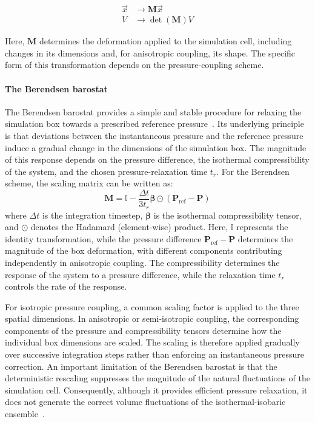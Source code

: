 \begin{subequations}\label{eq:scaling_general}
    \begin{align}
        \vec{x} &\rightarrow \mathbf{M}\vec{x} \\
        V &\rightarrow \det(\mathbf{M})V
    \end{align}
\end{subequations}

Here, $\mathbf{M}$ determines the deformation applied to the simulation cell, including changes in its dimensions and, for anisotropic coupling, its shape. The specific form of this transformation depends on the pressure-coupling scheme.


\paragraph{The Berendsen barostat}
The Berendsen barostat provides a simple and stable procedure for relaxing the simulation box towards a prescribed reference pressure~\cite{BerendsenB}. Its underlying principle is that deviations between the instantaneous pressure and the reference pressure induce a gradual change in the dimensions of the simulation box. The magnitude of this response depends on the pressure difference, the isothermal compressibility of the system, and the chosen pressure-relaxation time $t_r$.
For the Berendsen scheme, the scaling matrix can be written as:
\begin{equation}\label{eq:berendsen}
\mathbf{M}
=
\mathbb{I}
-
\frac{\Delta t}{3t_r}
\boldsymbol{\beta}
\odot
\left(
\mathbf{P}_{\mathrm{ref}}-\mathbf{P}
\right)
\end{equation}
where $\Delta t$ is the integration timestep, $\boldsymbol{\beta}$ is the isothermal compressibility tensor, and $\odot$ denotes the Hadamard
(element-wise) product. Here, $\mathbb{I}$ represents the identity transformation, while the pressure difference
$\mathbf{P}_{\mathrm{ref}}-\mathbf{P}$ determines the magnitude of the box deformation, with different components contributing independently in anisotropic coupling. The compressibility determines the response of the system to a pressure difference, while the relaxation time
$t_r$ controls the rate of the response.

For isotropic pressure coupling, a common scaling factor is applied to the three spatial dimensions. In anisotropic or semi-isotropic coupling, the corresponding components of the pressure and compressibility tensors determine how the individual box dimensions are scaled. The scaling is therefore applied gradually over successive integration steps rather than enforcing an instantaneous pressure correction.
An important limitation of the Berendsen barostat is that the deterministic rescaling suppresses the magnitude of the natural fluctuations of the simulation cell. Consequently, although it provides efficient pressure relaxation, it does not generate the correct volume fluctuations of the isothermal-isobaric ensemble~\cite{BerendsenB}.

